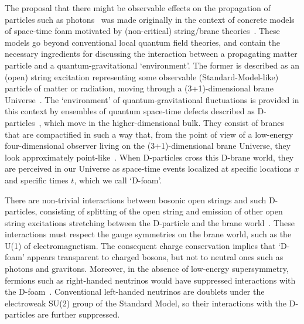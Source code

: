 \documentclass[12pt]{article}
\begin{document}
The proposal that there might be observable
effects on the propagation of particles such as photons~\cite{AEMNS} was made originally
in the context of concrete models of space-time foam motivated by (non-critical) string/brane theories~\cite{dfoam,mitsou}.
These models go beyond conventional local quantum field theories, and contain the necessary ingredients
for discussing the interaction between a propagating matter particle and a quantum-gravitational `environment'.
The former is described as an (open) string excitation representing some observable (Standard-Model-like) particle
of matter or radiation, moving through a (3+1)-dimensional brane Universe~\cite{polchinski}.
The `environment' of quantum-gravitational fluctuations is provided in this context by ensembles of
quantum space-time defects described as D-particles~\cite{dfoam}, which move in the higher-dimensional bulk.
They consist of branes that are compactified in such a way that, from the point of view of a low-energy four-dimensional
observer living on the (3+1)-dimensional brane Universe, they  look  approximately point-like~\cite{emnewuncert}.
When D-particles cross this D-brane world, they are perceived in our Universe
as space-time events localized at specific locations $x$ and specific times $t$, which we call `D-foam'.

There are non-trivial interactions between bosonic open strings and such D-particles, consisting of splitting of the open string and
emission of other open string excitations stretching between the D-particle and the brane world~\cite{emnewuncert}.
These interactions must respect the gauge symmetries on the brane world, such as the U(1) of electromagnetism.
The consequent charge conservation implies that `D-foam' appears transparent to charged bosons,
but not to neutral ones such as photons and gravitons. Moreover, in the absence of low-energy supersymmetry,
fermions such as right-handed neutrinos would have suppressed interactions with the D-foam~\cite{synchr}. Conventional
left-handed neutrinos are  doublets under the electroweak SU(2) group of the Standard Model,
so their interactions with the D-particles are further suppressed.
\end{document}
